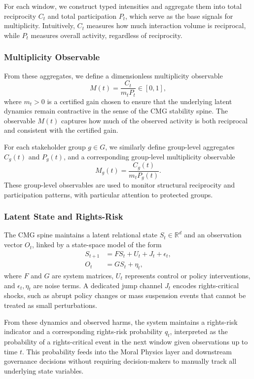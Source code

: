 \documentclass[11pt]{article}
\begin{document}
For each window, we construct typed intensities and aggregate them into total reciprocity \(C_t\) and total participation \(P_t\), which serve as the base signals for multiplicity. Intuitively, \(C_t\) measures how much interaction volume is reciprocal, while \(P_t\) measures overall activity, regardless of reciprocity.

\subsubsection{Multiplicity Observable}

From these aggregates, we define a dimensionless multiplicity observable
\[
M(t) = \frac{C_t}{m_t P_t} \in [0, 1],
\]
where \(m_t > 0\) is a certified gain chosen to ensure that the underlying latent dynamics remain contractive in the sense of the CMG stability spine. The observable \(M(t)\) captures how much of the observed activity is both reciprocal and consistent with the certified gain.

For each stakeholder group \(g \in G\), we similarly define group-level aggregates \(C_g(t)\) and \(P_g(t)\), and a corresponding group-level multiplicity observable
\[
M_g(t) = \frac{C_g(t)}{m_t P_g(t)}.
\]
These group-level observables are used to monitor structural reciprocity and participation patterns, with particular attention to protected groups.

\subsubsection{Latent State and Rights-Risk}

The CMG spine maintains a latent relational state \(S_t \in \mathbb{R}^d\) and an observation vector \(O_t\), linked by a state-space model of the form
\begin{align*}
S_{t+1} &= F S_t + U_t + J_t + \epsilon_t, \\
O_t &= G S_t + \eta_t,
\end{align*}
where \(F\) and \(G\) are system matrices, \(U_t\) represents control or policy interventions, and \(\epsilon_t, \eta_t\) are noise terms. A dedicated jump channel \(J_t\) encodes rights-critical shocks, such as abrupt policy changes or mass suspension events that cannot be treated as small perturbations.

From these dynamics and observed harms, the system maintains a rights-risk indicator and a corresponding rights-risk probability \(q_t\), interpreted as the probability of a rights-critical event in the next window given observations up to time \(t\). This probability feeds into the Moral Physics layer and downstream governance decisions without requiring decision-makers to manually track all underlying state variables.
\end{document}
